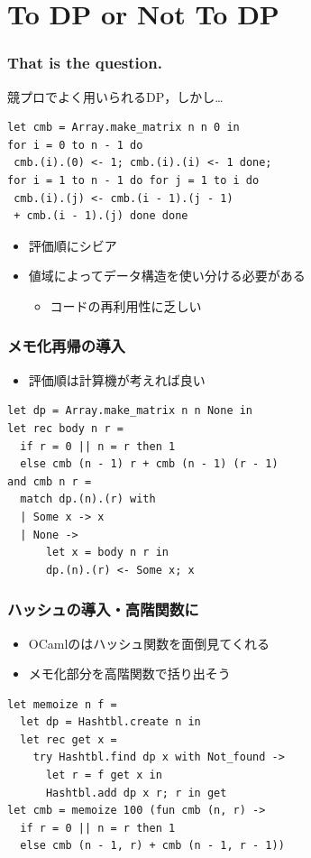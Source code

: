 \documentclass[dvipdfmx,cjk,xcolor=dvipsnames,envcountsect,notheorems,12pt]{beamer}
\theoremstyle{definition}
\begin{document}
\section{To DP or Not To DP\:}

\begin{frame}[fragile]
	\frametitle{That is the question.}
	{\Large 競プロでよく用いられるDP，しかし…}
	\begin{lstlisting}
let cmb = Array.make_matrix n n 0 in
for i = 0 to n - 1 do
 cmb.(i).(0) <- 1; cmb.(i).(i) <- 1 done;
for i = 1 to n - 1 do for j = 1 to i do
 cmb.(i).(j) <- cmb.(i - 1).(j - 1)
 + cmb.(i - 1).(j) done done
\end{lstlisting}
	\begin{itemize}
		\item 評価順にシビア
		\item 値域によってデータ構造を使い分ける必要がある
			\begin{itemize}
				\item コードの再利用性に乏しい
			\end{itemize}
	\end{itemize}
\end{frame}

\begin{frame}[fragile]
	\frametitle{メモ化再帰の導入}
	\begin{itemize}
		\item 評価順は計算機が考えれば良い
	\end{itemize}
	\begin{lstlisting}
let dp = Array.make_matrix n n None in
let rec body n r =
  if r = 0 || n = r then 1
  else cmb (n - 1) r + cmb (n - 1) (r - 1)
and cmb n r =
  match dp.(n).(r) with
  | Some x -> x
  | None ->
      let x = body n r in
      dp.(n).(r) <- Some x; x
\end{lstlisting}
\end{frame}

\begin{frame}[fragile]
	\frametitle{ハッシュの導入・高階関数に}
	\begin{itemize}
		\item OCamlのはハッシュ関数を面倒見てくれる
		\item メモ化部分を高階関数で括り出そう
	\end{itemize}
	\begin{lstlisting}
let memoize n f =
  let dp = Hashtbl.create n in
  let rec get x =
    try Hashtbl.find dp x with Not_found ->
      let r = f get x in
      Hashtbl.add dp x r; r in get
let cmb = memoize 100 (fun cmb (n, r) ->
  if r = 0 || n = r then 1
  else cmb (n - 1, r) + cmb (n - 1, r - 1))
\end{lstlisting}
\end{frame}
\end{document}
